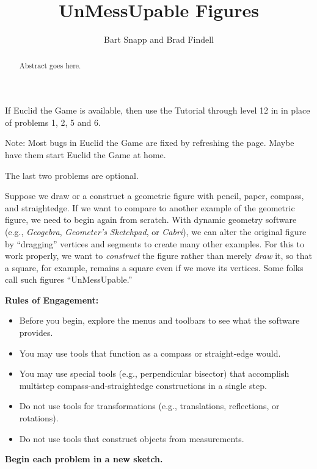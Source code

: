 \documentclass{ximera}
\title{UnMessUpable Figures}
\author{Bart Snapp and Brad Findell}
\begin{document}
\begin{abstract}
Abstract goes here.  
\end{abstract}
\maketitle

\begin{teachingnote}
If Euclid the Game is available, then use the Tutorial through level 12 in in place of problems 1, 2, 5 and 6.  

Note:  Most bugs in Euclid the Game are fixed by refreshing the page.  Maybe have them start Euclid the Game at home.  

The last two problems are optional.
\end{teachingnote}

 
Suppose we draw or a construct a geometric figure with pencil, paper, compass, and straightedge.  If we want to compare to another example of the geometric figure, we need to begin again from scratch.  With dynamic geometry software (e.g., \textsl{Geogebra}, \textsl{Geometer's Sketchpad}, or \textsl{Cabri}), we can alter the original figure by ``dragging'' vertices and segments to create many other examples.  For this to work properly, we want to \emph{construct} the figure rather than merely \emph{draw} it, so that a square, for example, remains a square even if we move its vertices.  Some folks call such figures ``UnMessUpable.'' 

\vspace{0.1in}
\begin{center}
\textbf{Rules of Engagement:}
\end{center}
\begin{itemize}
\itemsep0em
\item Before you begin, explore the menus and toolbars to see what the software provides.  
\item You may use tools that function as a compass or straight-edge would.  
\item You may use special tools (e.g., perpendicular bisector) that accomplish multistep     
compass-and-straightedge constructions in a single step.
\item Do not use tools for transformations (e.g., translations, reflections, or rotations).
\item Do not use tools that construct objects from measurements.  
\end{itemize}

\begin{center}
\textbf{Begin each problem in a new sketch.}
\end{center}
\end{document}
